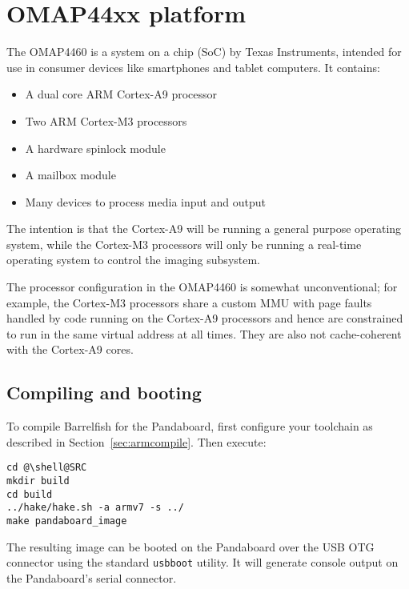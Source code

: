 \documentclass[a4paper,twoside]{report} %
\begin{document}
\chapter{OMAP44xx platform}


The OMAP4460 is a system on a chip (SoC) by Texas Instruments,
intended for use in consumer devices like smartphones and tablet
computers. It contains:

\begin{itemize}
\item A dual core ARM Cortex-A9 processor
\item Two ARM Cortex-M3 processors
\item A hardware spinlock module
\item A mailbox module
\item Many devices to process media input and output
\end{itemize}

The intention is that the Cortex-A9 will be running a general purpose
operating system, while the Cortex-M3 processors will only be running
a real-time operating system to control the imaging subsystem.

The processor configuration in the OMAP4460 is somewhat
unconventional; for example, the Cortex-M3 processors share a
custom MMU with page faults handled by code running on the Cortex-A9
processors and hence are constrained to run in the same virtual
address at all times.  They are also not cache-coherent with the
Cortex-A9 cores. 

\section{Compiling and booting}

To compile Barrelfish for the Pandaboard, first configure your
toolchain as described in Section~\ref{sec:armcompile}. Then execute: 

\begin{lstlisting}
cd @\shell@SRC
mkdir build
cd build
../hake/hake.sh -a armv7 -s ../
make pandaboard_image
\end{lstlisting}

The resulting image can be booted on the Pandaboard over the USB OTG
connector using the standard \texttt{usbboot} utility.  It will
generate console output on the Pandaboard's serial connector.
\end{document}
